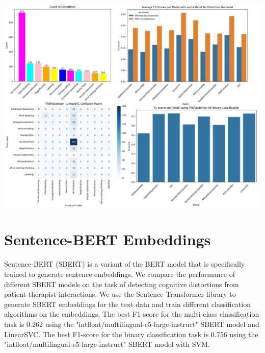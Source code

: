 \documentclass[a0,landscape]{a0poster}
\begin{document}
\begin{multicols}{4}
\begin{center}\vspace{0.5cm}
	\includegraphics[width=0.99\linewidth]{figures/1stFour.png}
\end{center}\vspace{0.5cm}

\color{Teal}
\section*{Sentence-BERT Embeddings}
\color{Black}

Sentence-BERT (SBERT) is a variant of the BERT model that is specifically trained to generate sentence embeddings. We compare the performance of different SBERT models 
on the task of detecting cognitive distortions from patient-therapist interactions. We use the Sentence Transformer library to generate SBERT embeddings for the text 
data and train different classification algorithms on the embeddings. The best F1-score for the multi-class classification task is 0.262 using the 
"intfloat/multilingual-e5-large-instruct" SBERT model and LinearSVC. The best F1-score for the binary classification task is 0.756 using the 
"intfloat/multilingual-e5-large-instruct" SBERT model with SVM.


\end{multicols}
\end{document}
